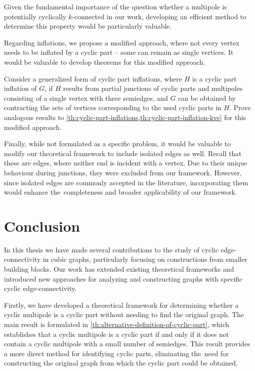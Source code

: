 \documentclass[12pt, twoside]{book}
\begin{document}
Given the fundamental importance of the question whether a multipole is potentially cyclically $k$-connected in our work, developing an efficient method to determine this property would be particularly valuable.

Regarding inflations, we propose a modified approach, where not every vertex needs to be inflated by a cyclic part -- some can remain as single vertices. It would be valuable to develop theorems for this modified approach.

\begin{problem}
	Consider a generalized form of cyclic part inflations, where $H$ is a cyclic part inflation of $G$, if $H$ results from partial junctions of cyclic parts and multipoles consisting of a single vertex with three semiedges, and $G$ can be obtained by contracting the sets of vertices corresponding to the used cyclic parts in $H$. Prove analogous results to \cref{th:cyclic-part-inflations,th:cyclic-part-inflation-kve} for this modified approach.
\end{problem}

Finally, while not formulated as a specific problem, it would be valuable to modify our theoretical framework to include isolated edges as well. Recall that these are edges, where neither end is incident with a vertex. Due to their unique behaviour during junctions, they were excluded from our framework. However, since isolated edges are commonly accepted in the literature, incorporating them would enhance the~completeness and broader applicability of our framework.

\chapter*{Conclusion}

In this thesis we have made several contributions to the study of cyclic edge-connectivity in cubic graphs, particularly focusing on constructions from smaller building blocks. Our work has extended existing theoretical frameworks and introduced new approaches for analyzing and constructing graphs with specific cyclic edge-connectivity.

Firstly, we have developed a theoretical framework for determining whether a cyclic multipole is a cyclic part without needing to find the original graph. The main result is formulated in \cref{th:alternative-definition-of-cyclic-part}, which establishes that a cyclic multipole is a cyclic part if and only if it does not contain a cyclic multipole with a small number of semiedges. This result provides a more direct method for identifying cyclic parts, eliminating the~need for constructing the original graph from which the cyclic part could be obtained.
\end{document}

